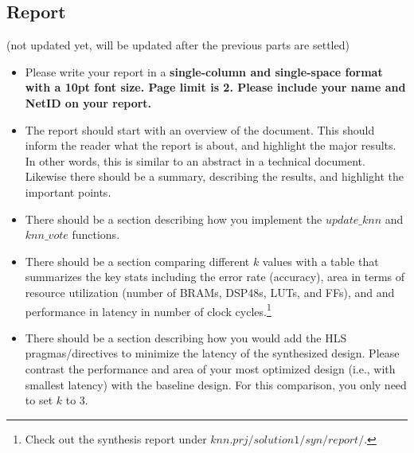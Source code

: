 \documentclass[paper=letter, fontsize=10pt]{scrartcl} %
\numberwithin{equation}{section} %
\numberwithin{figure}{section} %
\numberwithin{table}{section} %
\begin{document}
\subsection{Report}
(not updated yet, will be updated after the previous parts are settled)
\begin{itemize}
\item Please write your report in a \textbf{single-column and single-space format with a 10pt font size. Page limit is 2. Please include your name and NetID on your report.}

\item The report should start with an overview of the document. This should inform the reader what the report is about, and highlight the major results. In other words, this is similar to an abstract in a technical document. Likewise there should be a summary, describing the results, and highlight the important points.

\item There should be a section describing how you implement the $update\_knn$ and $knn\_vote$ functions.

\item There should be a section comparing different $k$ values with a table that summarizes the key stats including the error rate (accuracy), area in terms of resource utilization (number of BRAMs, DSP48s, LUTs, and FFs), and and performance in latency in number of clock cycles.\footnote{Check out the synthesis report under $knn.prj/solution1/syn/report/$.} 

\item There should be a section describing how you would add the HLS pragmas/directives to minimize the latency of the synthesized design. Please contrast the performance and area of your most optimized design (i.e., with smallest latency) with the baseline design. For this comparison, you only need to set $k$ to 3. 



\end{itemize}
\end{document}
